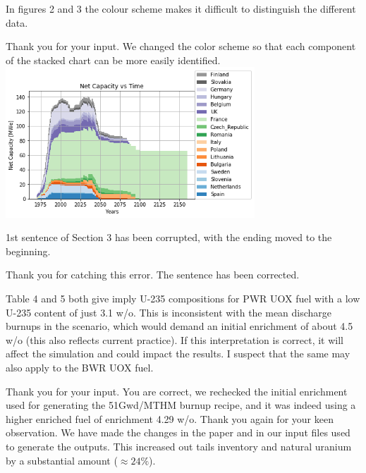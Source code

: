 \documentclass[answers,11pt]{exam}
\begin{document}
\begin{questions}
        \question In figures 2 and 3 the colour scheme makes it difficult to 
        distinguish the different data.
        \begin{solution}
        	Thank you for your input. We changed the color scheme so that
        	each component of the stacked chart can be more easily identified.
        	\includegraphics[width=0.7\textwidth]{../images/eu_future/onesim.png}
        \end{solution}

        \question 1st sentence of Section 3 has been corrupted, with the ending 
        moved to the beginning.

        \begin{solution}
                Thank you for catching this error. The sentence has been corrected.
        \end{solution}

        \question Table 4 and 5 both give imply U-235 compositions for PWR UOX 
        fuel with a low U-235 content of just 3.1 w/o. This is inconsistent 
        with the mean discharge burnups in the scenario, which would demand an 
        initial enrichment of about 4.5 w/o (this also reflects current 
        practice). If this interpretation is correct, it will affect the 
        simulation and could impact the results. I suspect that the same may 
        also apply to the BWR UOX fuel. 
        \begin{solution}
                Thank you for your input. You are correct, we rechecked the
                initial enrichment used for generating the 51Gwd/MTHM burnup
                recipe, and it was indeed using a higher enriched fuel of
                enrichment 4.29 w/o. Thank you again for your keen observation.
                We have made the changes in the paper and in our input files
                used to generate the outputs. This increased out tails inventory
                and natural uranium by a substantial amount ($\approx 24\%$).
        \end{solution}


\end{questions}
\end{document}
